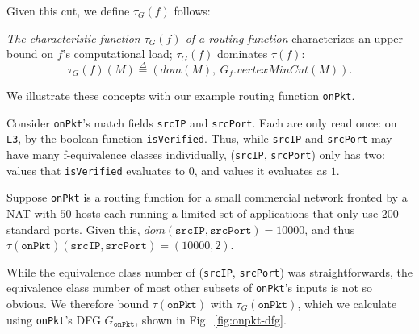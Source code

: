 Given this cut, we define $\tau_G(f)$ follows:



\begin{definition} {\em The characteristic function $\tau_G(f)$ of a routing function} characterizes an upper bound on $f$'s computational load; $\tau_G(f)$ dominates $\tau(f)$:
\begin{equation*}
\tau_G(f)(M) \overset{\Delta}{=} (dom(M),\ G_f.vertexMinCut(M)).
\end{equation*}
\end{definition}

 We illustrate these concepts with our example routing function \texttt{onPkt}.

Consider \texttt{onPkt}'s match fields \texttt{srcIP} and \texttt{srcPort}. Each are only read once: on \texttt{L3}, by the boolean function \texttt{isVerified}. Thus, while \texttt{srcIP} and \texttt{srcPort} may have many f-equivalence classes individually, (\texttt{srcIP}, \texttt{srcPort}) only has two: values that \texttt{isVerified} evaluates to $0$, and values it evaluates as $1$.

Suppose \texttt{onPkt} is a routing function for a small commercial network fronted by a NAT with $50$ hosts each running a limited set of applications that only use $200$ standard ports. Given this, $dom(\texttt{srcIP}, \texttt{srcPort}) = 10000$, and thus $\tau(\texttt{onPkt})(\texttt{srcIP}, \texttt{srcPort}) = (10000, 2)$. 

While the equivalence class number of (\texttt{srcIP}, \texttt{srcPort}) was straightforwards, the equivalence class number of most other subsets of \texttt{onPkt}'s inputs is not so obvious. We therefore bound $\tau(\texttt{onPkt})$ with $\tau_G(\texttt{onPkt})$, which we calculate using \texttt{onPkt}'s DFG $G_{\texttt{onPkt}}$, shown in Fig.~\ref{fig:onpkt-dfg}.


